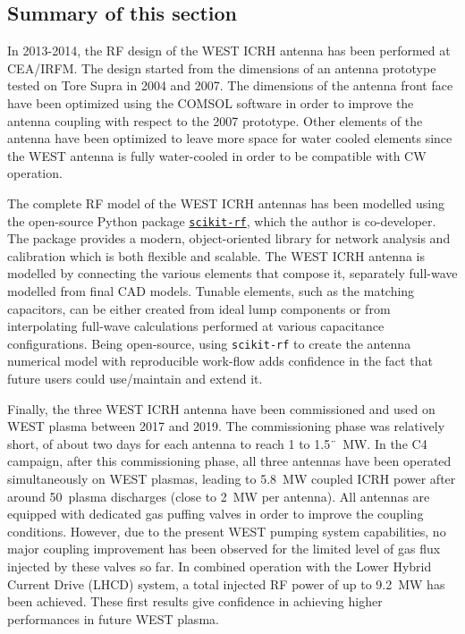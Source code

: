 {

\subsection{Summary of this section}
In 2013-2014, the RF design of the WEST ICRH antenna has been performed at CEA/IRFM. The design started from the dimensions of an antenna prototype tested on Tore Supra in 2004 and 2007. The dimensions of the antenna front face have been optimized using the COMSOL software in order to improve the antenna coupling with respect to the 2007 prototype. Other elements of the antenna have been optimized to leave more space for water cooled elements since the WEST antenna is fully water-cooled in order to be compatible with CW operation. 

The complete RF model of the WEST ICRH antennas has been modelled using the open-source Python package \href{http://scikit-rf.org/}{\texttt{scikit-rf}}, which the author is co-developer. The package provides a modern, object-oriented library for network analysis and calibration which is both flexible and scalable. The WEST ICRH antenna is modelled by connecting the various elements that compose it, separately full-wave modelled from final CAD models. Tunable elements, such as the matching capacitors, can be either created from ideal lump components or from interpolating full-wave calculations performed at various capacitance configurations. Being open-source, using \texttt{scikit-rf} to create the antenna numerical model with reproducible work-flow adds confidence in the fact that future users could use/maintain and extend it.

Finally, the three WEST ICRH antenna have been commissioned and used on WEST plasma between 2017 and 2019. The commissioning phase was relatively short, of about two days for each antenna to reach 1 to 1.5¨~MW. In the C4 campaign, after this commissioning phase, all three antennas have been operated simultaneously on WEST plasmas, leading to 5.8~MW coupled ICRH power after around 50~plasma discharges (close to 2~MW per antenna). All antennas are equipped with dedicated gas puffing valves in order to improve the coupling conditions. However, due to the present WEST pumping system capabilities, no major coupling improvement has been observed for the limited level of gas flux injected by these valves so far. In combined operation with the Lower Hybrid Current Drive (LHCD) system, a total injected RF power of up to 9.2~MW has been achieved. These first results give confidence in achieving higher performances in future WEST plasma.


}

